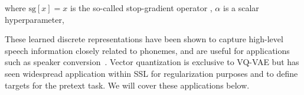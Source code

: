 %
\noindent where  $\mathrm{sg}[x] = x$ is the so-called stop-gradient operator , $\alpha$ is a scalar hyperparameter, 

These learned discrete representations have been shown to capture high-level
speech information closely related to phonemes, and are useful for
applications such as speaker conversion~\cite{chorowski2019unsupervised}.
Vector quantization is  exclusive to VQ-VAE but has seen
widespread application within SSL for regularization purposes and to define
targets for the pretext task. We will cover these applications below.

